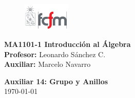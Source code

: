 \documentclass[letterpaper,10pt]{article}
\theoremstyle{plain}
\begin{document}
\newpage
\pagestyle{fancy}
\fancyhf{}

\begin{figure} %
    \vspace{-5mm}
    \includegraphics[width=0.2\textwidth]{img/fcfm2.png}
\end{figure}


\noindent
\textbf{MA1101-1 Introducción al Álgebra}\\
\textbf{Profesor: }Leonardo Sánchez C.\\
\textbf{Auxiliar: }Marcelo Navarro

\begin{center}
{\bf \Large Auxiliar 14: Grupo y Anillos}\\
{\today}
\end{center}
\end{document}

